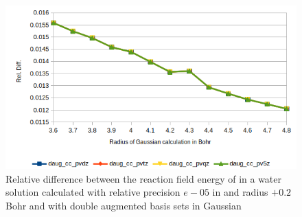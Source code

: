 \documentclass[../master_thesis.tex]{subfiles}
\begin{document}
\begin{figure}[!htb]
  \centering
    \includegraphics[width=\linewidth]{img/lipdaugreldiff02.png}
  \caption[Relative difference of shifted radius  against Gaussian double augmented results]{Relative difference between the reaction field energy of  in a water solution calculated with relative precision $e-05$ in \mrchem and radius $+ 0.2$ Bohr
  and with double augmented basis sets in Gaussian}
  \label{fig:lipreldiff02daug}
\end{figure}
\end{document}
